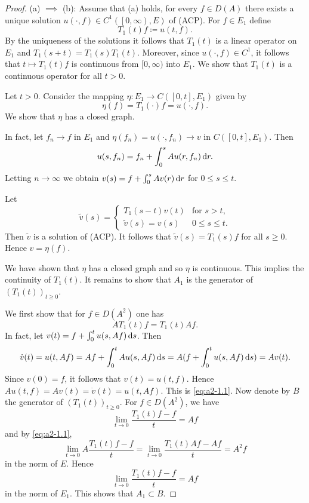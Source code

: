 \begin{proof} (a) $\implies$ (b):   
Assume that (a) holds, \ie for every $f \in D(A)$ there exists a unique solution $u(\cdot,f) \in C^{1}(\left[0,\infty\right),E)$ of (ACP).
For $f \in E_{1}$ define \\
%
\[
T_{1}(t)f \coloneqq u(t,f).
\]
By the uniqueness of the solutions it follows that $T_{1}(t)$ is a linear operator on $E_{1}$ and $T_{1}(s+t) = T_{1}(s)T_{1}(t)$.
Moreover, since $u(\cdot,f) \in C^{1}$, it follows that $t \mapsto T_{1}(t)f$ is continuous from $[0,\infty)$ into $E_{1}$.
We show that $T_{1}(t)$ is a continuous operator for all $t > 0$.

Let $t > 0$.
Consider the mapping $\eta \colon E_{1} \to C([0,t],E_{1})$ given by 
\[
\eta(f) = T_{1}(\cdot)f = u(\cdot,f) .
\]
We show that $\eta$ has a closed graph.

In fact, let $f_{n} \to f$ in $E_{1}$ and $\eta(f_{n}) = u(\cdot,f_{n}) \to v$ in $C([0,t],E_{1})$.
Then 
\[
u(s,f_{n}) = f_{n} + \int_{0}^{s} Au(r,f_{n}) \mathop{}\!\mathrm{d}{r} .
\]
Letting $n \to \infty$ we obtain $v(s) = f + \int_{0}^{s} Av(r) \mathop{}\!\mathrm{d}{r}$ for $0 \leq s \leq t$.

Let 
\[
\tilde{v}(s) = 
\begin{cases}
    T_{1}(s-t)v(t)      & \text{for $s > t$,}\\
    \tilde{v}(s) = v(s) & \text{$0 \leq s \leq t$.}
\end{cases}
\]
Then $\tilde{v}$ is a solution of (ACP).
It follows that $\tilde{v}(s) = T_{1}(s)f$ for all $s \geq 0$.
Hence $v = \eta (f)$.

We have shown that $\eta$ has a closed graph and so $\eta$ is continuous.
This implies the continuity of $T_{1}(t)$.
It remains to show that $A_{1}$ is the generator of $(T_{1}(t))_{t \geq 0}$.

We first show that for $f \in D(A^{2})$ one has
\begin{equation}\label{eq:a2-1.1}
AT_{1}(t)f = T_{1}(t)Af.
\end{equation}
In fact, let $v(t) = f + \int_{0}^{t} u(s,Af) \mathop{}\!\mathrm{d}{s}$.
Then 
\[
\dot{v}(t) = u(t,Af) = Af + \int_{0}^{t} Au(s,Af) \mathop{}\!\mathrm{d}{s} = A(f + \int_{0}^{t} u(s,Af) \mathop{}\!\mathrm{d}{s}) = Av(t). 
\]
Since $v(0) = f$, it follows that $v(t) = u(t,f)$.
Hence $Au(t,f) = Av(t) = \dot{v}(t) = u(t,Af)$.
This is \eqref{eq:a2-1.1}.
Now denote by $B$ the generator of $(T_{1}(t))_{t \geq 0}$.
For $f \in D(A^{2})$, we have
\[
    \lim_{t \to 0} \frac{T_{1}(t)f - f}{t} = Af
\]
and by \eqref{eq:a2-1.1},
\[
    \lim_{t \to 0} A\frac{T_{1}(t)f - f}{t} = 
    \lim_{t \to 0} \frac{T_{1}(t)Af - Af}{t} = A^{2}f
\]
in the norm of $E$.
Hence 
\[ 
\lim_{t \to 0} \frac{T_{1}(t)f - f}{t} = Af
\]
in the norm of $E_{1}$.
This shows that $A_{1} \subset B$.


\end{proof}
